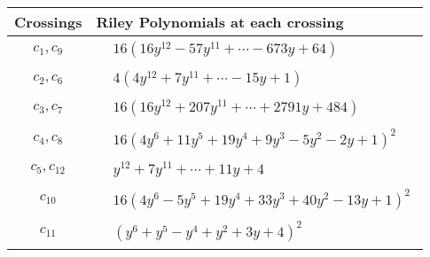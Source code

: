 \documentclass[1p]{elsarticle_modified}
\theoremstyle{definition}
\begin{document}
\begin{tabular}{m{50pt}|m{274pt}}
Crossings & \hspace{64pt}Riley Polynomials at each crossing \\
\hline $$\begin{aligned}c_{1},c_{9}\end{aligned}$$&$\begin{aligned}
&16(16 y^{12}-57 y^{11}+\cdots-673 y+64)
\end{aligned}$\\
\hline $$\begin{aligned}c_{2},c_{6}\end{aligned}$$&$\begin{aligned}
&4(4 y^{12}+7 y^{11}+\cdots-15 y+1)
\end{aligned}$\\
\hline $$\begin{aligned}c_{3},c_{7}\end{aligned}$$&$\begin{aligned}
&16(16 y^{12}+207 y^{11}+\cdots+2791 y+484)
\end{aligned}$\\
\hline $$\begin{aligned}c_{4},c_{8}\end{aligned}$$&$\begin{aligned}
&16(4 y^6+11 y^5+19 y^4+9 y^3-5 y^2-2 y+1)^2
\end{aligned}$\\
\hline $$\begin{aligned}c_{5},c_{12}\end{aligned}$$&$\begin{aligned}
&y^{12}+7 y^{11}+\cdots+11 y+4
\end{aligned}$\\
\hline $$\begin{aligned}c_{10}\end{aligned}$$&$\begin{aligned}
&16(4 y^6-5 y^5+19 y^4+33 y^3+40 y^2-13 y+1)^2
\end{aligned}$\\
\hline $$\begin{aligned}c_{11}\end{aligned}$$&$\begin{aligned}
&(y^6+y^5- y^4+y^2+3 y+4)^2
\end{aligned}$\\
\hline
\end{tabular}\\~\\
\end{document}
